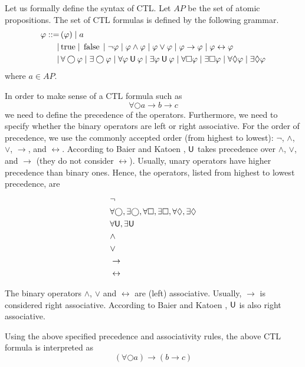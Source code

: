 \documentclass[12pt]{article}
\newcommand{\always}{\Box}
\newcommand{\eventually}{\Diamond}
\newcommand{\nxt}{\bigcirc}
\newcommand{\until}{\mathbin{\sf U}}
\newcommand{\TRUE}{\mbox{\lstinline{true}}}
\newcommand{\FALSE}{\mbox{\lstinline{false}}}
\theoremstyle{definition}
\begin{document}
Let us formally define the syntax of CTL.  Let $\mathit{AP}$ be the set of atomic propositions.  The set of CTL formulas is defined by the following grammar.
\begin{align*}
\varphi
::= \, & ( \varphi ) 
\mid a\\
\mid\, & \TRUE
\mid \FALSE
\mid \neg \varphi
\mid \varphi \wedge \varphi
\mid \varphi \vee \varphi
\mid \varphi \rightarrow \varphi
\mid \varphi \leftrightarrow \varphi\\
\mid \, & \forall \nxt \varphi
\mid \exists \nxt \varphi
\mid \forall \varphi \until \varphi
\mid \exists \varphi \until \varphi
\mid \forall \always \varphi
\mid \exists \always \varphi
\mid \forall \eventually \varphi
\mid \exists \eventually \varphi
\end{align*}
where $a \in \mathit{AP}$.  

In order to make sense of a CTL formula such as
\[
\forall \nxt a \rightarrow b \rightarrow c
\]
we need to define the precedence of the operators.  Furthermore, we need to specify whether the binary operators are left or right associative.  For the order of precedence, we use the commonly accepted order (from highest to lowest): $\neg$, $\wedge$, $\vee$, $\rightarrow$, and $\leftrightarrow$.  According to Baier and Katoen \cite{BK08}, $\until$ takes precedence over $\wedge$, $\vee$, and $\rightarrow$ (they do not consider $\leftrightarrow$).  Usually, unary operators have higher precedence than binary ones.  Hence, the operators, listed from highest to lowest precedence, are
\begin{align*}
& \neg\\
& \forall \nxt, \exists \nxt, \forall \always, \exists \always, \forall \eventually, \exists \eventually\\
& \forall \until, \exists \until\\
& \wedge\\
& \vee\\
& \rightarrow\\
& \leftrightarrow
\end{align*}

The binary operators $\wedge$, $\vee$ and $\leftrightarrow$ are (left) associative.  Usually, $\rightarrow$ is considered right associative.  According to Baier and Katoen \cite{BK08}, $\until$ is also right associative.

Using the above specified precedence and associativity rules, the above CTL formula is interpreted as
\[
(\forall \nxt a) \rightarrow (b \rightarrow c)
\]
\end{document}
